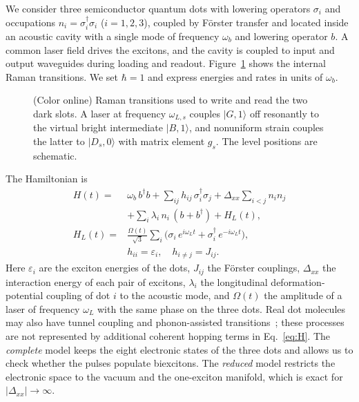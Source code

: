 \documentclass[aps,pra,preprint,groupedaddress,amsmath,amssymb,floatfix]{revtex4-2}
\newcommand{\ket}[1]{\lvert #1\rangle}
\newcommand{\wb}{\omega_b}
\newcommand{\Dxx}{\Delta_{xx}}
\begin{document}
We consider three semiconductor quantum dots with lowering operators $\sigma_i$ and occupations $n_i=\sigma_i^\dagger\sigma_i$ ($i=1,2,3$), coupled by F\"orster transfer and located inside an acoustic cavity with a single mode of frequency $\wb$ and lowering operator $b$. A common laser field drives the excitons, and the cavity is coupled to input and output waveguides during loading and readout. Figure~\ref{fig:scheme} shows the internal Raman transitions. We set $\hbar=1$ and express energies and rates in units of $\wb$.

\begin{figure}[t]
\centering
\resizebox{\columnwidth}{!}{}
\caption{(Color online) Raman transitions used to write and read the two dark slots. A laser at frequency $\omega_{L,s}$ couples $\ket{G,1}$ off resonantly to the virtual bright intermediate $\ket{B,1}$, and nonuniform strain couples the latter to $\ket{D_s,0}$ with matrix element $g_s$. The level positions are schematic.}
\label{fig:scheme}
\end{figure}

The Hamiltonian is
\begin{align}
H(t)={}&\wb\, b^\dagger b+\sum_{ij}h_{ij}\,\sigma_i^\dagger\sigma_j
+\Dxx\sum_{i<j}n_in_j\nonumber\\
&+\sum_i\lambda_i\,n_i\,(b+b^\dagger)+H_L(t),\label{eq:H}\\
H_L(t)={}&\frac{\Omega(t)}{\sqrt3}\sum_i\bigl(\sigma_i\,e^{i\omega_Lt}+\sigma_i^\dagger\,e^{-i\omega_Lt}\bigr),\nonumber\\
&h_{ii}=\varepsilon_i,\quad h_{i\neq j}=J_{ij}.\nonumber
\end{align}
Here $\varepsilon_i$ are the exciton energies of the dots, $J_{ij}$ the F\"orster couplings, $\Dxx$ the interaction energy of each pair of excitons, $\lambda_i$ the longitudinal deformation-potential coupling of dot $i$ to the acoustic mode, and $\Omega(t)$ the amplitude of a laser of frequency $\omega_L$ with the same phase on the three dots. Real dot molecules may also have tunnel coupling and phonon-assisted transitions~\cite{daniels2013}; these processes are not represented by additional coherent hopping terms in Eq.~\eqref{eq:H}. The \emph{complete} model keeps the eight electronic states of the three dots and allows us to check whether the pulses populate biexcitons. The \emph{reduced} model restricts the electronic space to the vacuum and the one-exciton manifold, which is exact for $|\Dxx|\to\infty$.
\end{document}
